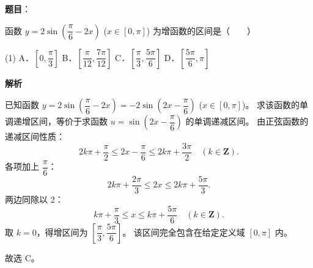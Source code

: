 \begin{answer}

\textbf{题目}：

函数 $y = 2\sin\left(\dfrac{\pi}{6} - 2x\right)$ ($x \in [0, \pi]$) 为增函数的区间是\mbox{（　　）}

\begin{gkopts}(1)
\task A．$\left[0, \dfrac{\pi}{3}\right]$
\task B．$\left[\dfrac{\pi}{12}, \dfrac{7\pi}{12}\right]$
\task C．$\left[\dfrac{\pi}{3}, \dfrac{5\pi}{6}\right]$
\task D．$\left[\dfrac{5\pi}{6}, \pi\right]$
\end{gkopts}

\textbf{解析}

已知函数 $y = 2\sin\left(\dfrac{\pi}{6} - 2x\right) = -2\sin\left(2x - \dfrac{\pi}{6}\right)$ ($x \in [0, \pi]$)。
求该函数的单调递增区间，等价于求函数 $u = \sin\left(2x - \dfrac{\pi}{6}\right)$ 的单调递减区间。
由正弦函数的递减区间性质：
\nopagebreak[4]
\[
2k\pi + \dfrac{\pi}{2} \le 2x - \dfrac{\pi}{6} \le 2k\pi + \dfrac{3\pi}{2} \quad (k \in \mathbf{Z}).
\]
各项加上 $\dfrac{\pi}{6}$：
\nopagebreak[4]
\[
2k\pi + \dfrac{2\pi}{3} \le 2x \le 2k\pi + \dfrac{5\pi}{3}.
\]
两边同除以 2：
\nopagebreak[4]
\[
k\pi + \dfrac{\pi}{3} \le x \le k\pi + \dfrac{5\pi}{6} \quad (k \in \mathbf{Z}).
\]
取 $k = 0$，得增区间为 $\left[\dfrac{\pi}{3}, \dfrac{5\pi}{6}\right]$。
该区间完全包含在给定定义域 $[0, \pi]$ 内。

故选 C。


\end{answer}

